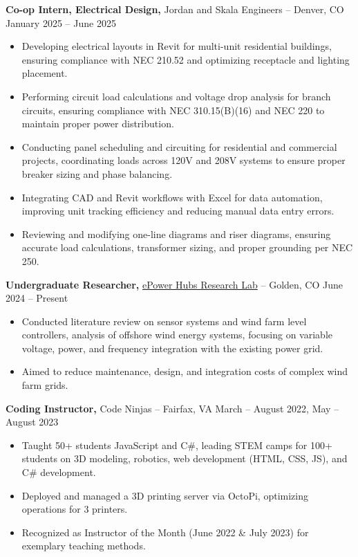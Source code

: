 \documentclass[11pt]{article}       %
\begin{document}
\textbf{Co-op Intern, Electrical Design, }{Jordan and Skala Engineers} -- Denver, CO \hfill January 2025 -- June 2025 \\
\vspace{-6.5pt}
\begin{itemize}
  \item Developing electrical layouts in Revit for multi-unit residential buildings, ensuring compliance with NEC 210.52 and optimizing receptacle and lighting placement.
  \item Performing circuit load calculations and voltage drop analysis for branch circuits, ensuring compliance with NEC 310.15(B)(16) and NEC 220 to maintain proper power distribution.
  \item Conducting panel scheduling and circuiting for residential and commercial projects, coordinating loads across 120V and 208V systems to ensure proper breaker sizing and phase balancing.
  \item Integrating CAD and Revit workflows with Excel for data automation, improving unit tracking efficiency and reducing manual data entry errors.
  \item Reviewing and modifying one-line diagrams and riser diagrams, ensuring accurate load calculations, transformer sizing, and proper grounding per NEC 250.
\end{itemize}


\textbf{Undergraduate Researcher, }{\href{https://www.epowerhubs.com/home}{ePower Hubs Research Lab}} -- Golden, CO \hfill June 2024 -- Present \\
\vspace{-6.5pt}
\begin{itemize}
  \item Conducted literature review on sensor systems and wind farm level controllers, analysis of offshore wind energy systems, focusing on variable voltage, power, and frequency integration with the existing power grid.
  \item Aimed to reduce maintenance, design, and integration costs of complex wind farm grids.
\end{itemize}


\textbf{Coding Instructor, }{Code Ninjas} -- Fairfax, VA \hfill March -- August 2022, May -- August 2023 \\
\vspace{-6.5pt}
\begin{itemize}
  \item Taught 50+ students JavaScript and C\#, leading STEM camps for 100+ students on 3D modeling, robotics, web development (HTML, CSS, JS), and C\# development.
  \item Deployed and managed a 3D printing server via OctoPi, optimizing operations for 3 printers.
  \item Recognized as Instructor of the Month (June 2022 \& July 2023) for exemplary teaching methods.
\end{itemize}
\end{document}
